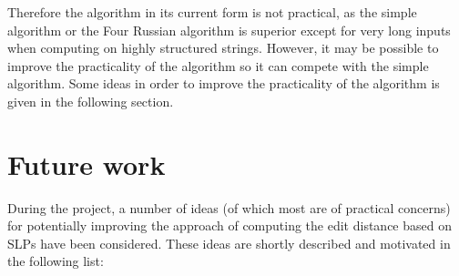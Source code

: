 \documentclass[twoside,11pt,openright]{report}
\begin{document}
Therefore the algorithm in its current form is not practical, as the simple algorithm or the Four Russian algorithm is superior except for very long inputs when computing on highly structured strings. However, it may be possible to improve the practicality of the algorithm so it can compete with the simple algorithm. Some ideas in order to improve the practicality of the algorithm is given in the following section.

\section{Future work}
\label{sec:conclusion:future-work}
During the project, a number of ideas (of which most are of practical concerns) for potentially improving the approach of computing the edit distance based on SLPs have been considered. These ideas are shortly described and motivated in the following list:
\end{document}
